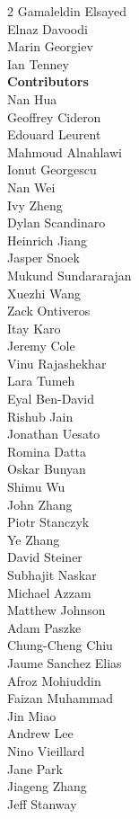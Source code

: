 \begin{multicols}{2}
Gamaleldin Elsayed \\
Elnaz Davoodi \\
Marin Georgiev \\
Ian Tenney \\
\textbf{Contributors} \\
Nan Hua \\
Geoffrey Cideron \\
Edouard Leurent \\
Mahmoud Alnahlawi \\
Ionut Georgescu \\
Nan Wei \\
Ivy Zheng \\
Dylan Scandinaro \\
Heinrich Jiang \\
Jasper Snoek \\
Mukund Sundararajan \\
Xuezhi Wang \\
Zack Ontiveros \\
Itay Karo \\
Jeremy Cole \\
Vinu Rajashekhar \\
Lara Tumeh \\
Eyal Ben-David \\
Rishub Jain \\
Jonathan Uesato \\
Romina Datta \\
Oskar Bunyan \\
Shimu Wu \\
John Zhang \\
Piotr Stanczyk \\
Ye Zhang \\
David Steiner \\
Subhajit Naskar \\
Michael Azzam \\
Matthew Johnson \\
Adam Paszke \\
Chung-Cheng Chiu \\
Jaume Sanchez Elias \\
Afroz Mohiuddin \\
Faizan Muhammad \\
Jin Miao \\
Andrew Lee \\
Nino Vieillard \\
Jane Park \\
Jiageng Zhang \\
Jeff Stanway \\

\end{multicols}
